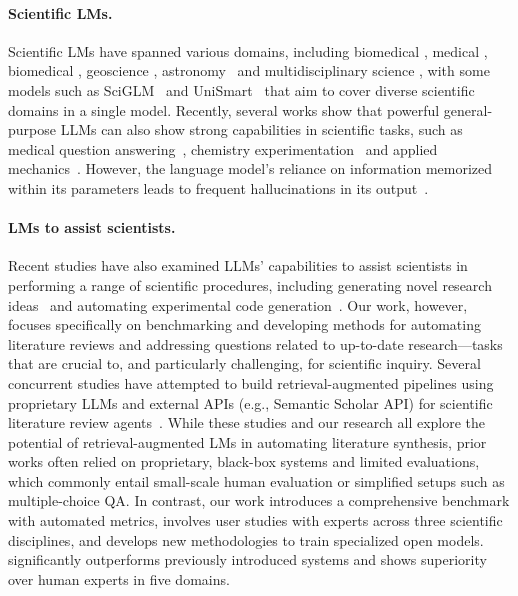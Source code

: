 \paragraph{Scientific LMs.}
Scientific LMs have spanned various domains, including biomedical \citep{SciFive2021,BioBART2022,BioGPT2022}, medical \citep{singhal2023large,MeLlama2024,PMCLlama2023,Meditron2023}, biomedical \citep{BioMedGPT2023,BioMedGPT2024,BioMistral2024}, geoscience \citep{K22023}, astronomy~\citep{AstroLLaMA2023} and multidisciplinary science \citep{DARWIN2023}, with some models such as SciGLM~\citep{SciGLM2024} and UniSmart~\citep{UniSmart2024} that aim to cover diverse scientific domains in a single model. 
Recently, several works show that powerful general-purpose LLMs can also show strong capabilities in scientific tasks, such as medical question answering~\citep{ai4science2023impact,singhal2023large}, chemistry experimentation~\citep{zheng2023gpt} and applied mechanics~\citep{10.1115/1.4062773}. 
However, the language model's reliance on information memorized within its parameters leads to frequent hallucinations in its output~\citep{li-etal-2024-dawn}. 

\paragraph{LMs to assist scientists.}
Recent studies have also examined LLMs' capabilities to assist scientists in performing a range of scientific procedures, including generating novel research ideas~\citep{baek2024researchagent,Yang2023LargeLM} and automating experimental code generation~\citep{Huang2023MLAgentBenchEL,tian2024scicode}. Our work, however, focuses specifically on benchmarking and developing methods for automating literature reviews and addressing questions related to up-to-date research—tasks that are crucial to, and particularly challenging, for scientific inquiry. 
Several concurrent studies have attempted to build retrieval-augmented pipelines using proprietary LLMs and external APIs (e.g., Semantic Scholar API) for scientific literature review agents~\citep{agarwal2024litllm,skarlinski2024language,wang2024autosurvey}. While these studies and our research all explore the potential of retrieval-augmented LMs in automating literature synthesis, prior works often relied on proprietary, black-box systems and limited evaluations, which commonly entail small-scale human evaluation or simplified setups such as multiple-choice QA. 
In contrast, our work introduces a comprehensive benchmark with automated metrics, involves user studies with experts across three scientific disciplines, and develops new methodologies to train specialized open models. \model significantly outperforms previously introduced systems and shows superiority over human experts in five domains. 

